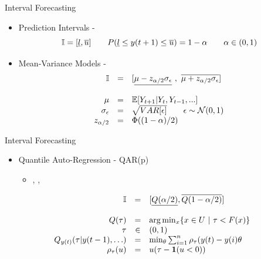 \documentclass{beamer}
\begin{document}
\begin{frame}{Interval Forecasting}
\begin{itemize}
\item Prediction Intervals - \cite{Chatfield1993}
$$
\mathbb{I} = [\underline{l},\overline{u}{]} \qquad P(\underline{l} \leq y(t+1) \leq \overline{u}) = 1 - \alpha \qquad \alpha \in (0,1)
$$
\item Mean-Variance Models - \cite{Chatfield2001}
\begin{equation}
    \begin{array}{rcl}
        \mathbb{I} & = & [\underline{\mu - z_{\alpha/2}\sigma_\epsilon}\ ,\ \overline{\mu + z_{\alpha/2}\sigma_\epsilon}] \\
        & & \\
         \mu &=& \mathbb{E}[Y_{t+1}|Y_t,Y_{t-1},...] \\
         \sigma_\epsilon & = & \sqrt{VAR[\epsilon]} \qquad
         \epsilon  \sim  \mathcal{N}(0,1) \\
         z_{\alpha/2} & = & \Phi((1- \alpha)/2)
    \end{array}
\end{equation}
\end{itemize}
\end{frame}


\begin{frame}{Interval Forecasting}
\linespread{2}
\begin{itemize}
\item Quantile Auto-Regression - QAR(p)
\begin{itemize}
\item \cite{Koenker2006}, \cite{Takeuchi2006}, \cite{Hansen2006}
\end{itemize}
\end{itemize}
\begin{equation}
    \begin{array}{rcl}
         \mathbb{I} & = & [\underline{Q(\alpha/2)}, \overline{Q(1-\alpha/2)}]  \\
         & & \\
        Q(\tau) & = & \arg\min_x\{ x \in U \ |\ \tau < F(x) \} \\
        \tau & \in & (0,1) \\
        Q_{y(t)}(\tau | y(t-1),\ldots) & = & \min_\theta \sum_{i=1}^n \rho_\tau (y(t) - y(i)\theta \\
        \rho_\tau(u) & = & u(\tau - \mathbf{1}(u < 0)) 
    \end{array}
\end{equation}
\end{frame}
\end{document}
